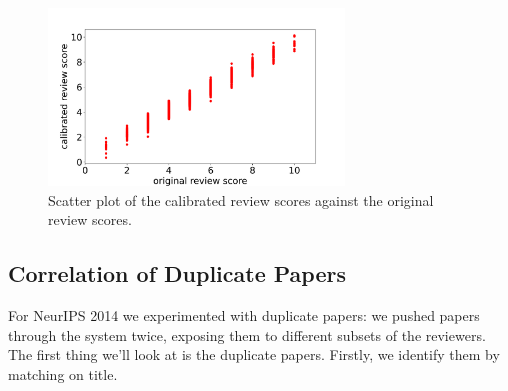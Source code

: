 \begin{figure}[htb]
\includegraphics[width=0.70\textwidth]{diagrams/neurips/calibrated-review-score-vs-original-score.pdf}


\caption{Scatter plot of the calibrated review scores against the original review scores.}
\label{calibrated-review-vs-original-score}
\end{figure}

\hypertarget{correlation-of-duplicate-papers}{%
\subsection{Correlation of Duplicate
Papers}\label{correlation-of-duplicate-papers}}

\begin{flushright}
\end{flushright}

For NeurIPS 2014 we experimented with duplicate papers: we pushed papers
through the system twice, exposing them to different subsets of the
reviewers. The first thing we'll look at is the duplicate papers.
Firstly, we identify them by matching on title.

\begin{Shaded}
\begin{Highlighting}[]
\OperatorTok{=}\OperatorTok{+} 
\OperatorTok{=}\OperatorTok{=}
\OperatorTok{=}\NormalTok{ []}
     \OperatorTok{\textgreater{}}  \OperatorTok{!=} \NormalTok{:}
\OperatorTok{=} \NormalTok{(papers.papers[papers.papers[}\NormalTok{].}\NormalTok{.contains(papers.papers.Title[ID].strip())].index)}
\OperatorTok{=}\NormalTok{)}
\end{Highlighting}
\end{Shaded}

